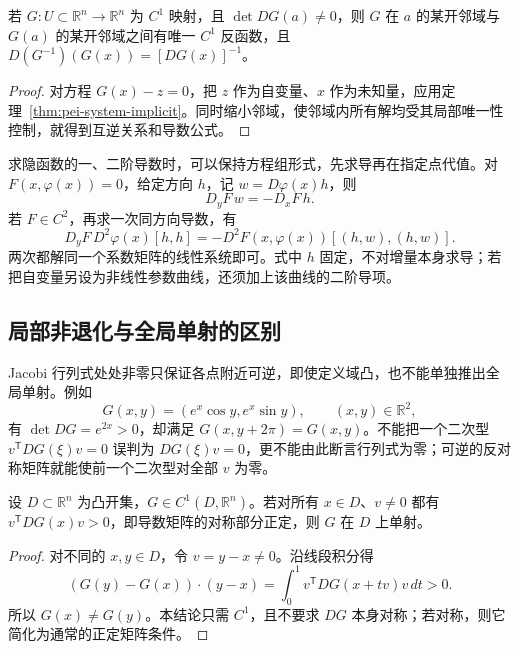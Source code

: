 \begin{corollary}
\label{cor:pei-inverse-function}
若 $G:U\subset\mathbb R^n\to\mathbb R^n$ 为 $C^1$ 映射，且 $\det DG(a)\ne0$，则 $G$ 在 $a$ 的某开邻域与 $G(a)$ 的某开邻域之间有唯一 $C^1$ 反函数，且 $D(G^{-1})(G(x))=[DG(x)]^{-1}$。
\end{corollary}
\begin{proof}
对方程 $G(x)-z=0$，把 $z$ 作为自变量、$x$ 作为未知量，应用定理~\ref{thm:pei-system-implicit}。同时缩小邻域，使邻域内所有解均受其局部唯一性控制，就得到互逆关系和导数公式。
\end{proof}

求隐函数的一、二阶导数时，可以保持方程组形式，先求导再在指定点代值。对 $F(x,\varphi(x))=0$，给定方向 $h$，记 $w=D\varphi(x)h$，则
\[
D_yF\,w=-D_xF\,h.
\]
若 $F\in C^2$，再求一次同方向导数，有
\begin{equation}
\label{eq:pei-implicit-second-differential}
D_yF\,D^2\varphi(x)[h,h]=-D^2F(x,\varphi(x))[(h,w),(h,w)].
\end{equation}
两次都解同一个系数矩阵的线性系统即可。式中 $h$ 固定，不对增量本身求导；若把自变量另设为非线性参数曲线，还须加上该曲线的二阶导项。

\subsection{局部非退化与全局单射的区别}

Jacobi 行列式处处非零只保证各点附近可逆，即使定义域凸，也不能单独推出全局单射。例如
\begin{equation}
\label{eq:pei-local-not-global-inverse}
G(x,y)=(e^x\cos y,e^x\sin y),\qquad(x,y)\in\mathbb R^2,
\end{equation}
有 $\det DG=e^{2x}>0$，却满足 $G(x,y+2\pi)=G(x,y)$。不能把一个二次型 $v^{\mathsf T}DG(\xi)v=0$ 误判为 $DG(\xi)v=0$，更不能由此断言行列式为零；可逆的反对称矩阵就能使前一个二次型对全部 $v$ 为零。

\begin{proposition}
\label{prop:pei-monotone-injectivity}
设 $D\subset\mathbb R^n$ 为凸开集，$G\in C^1(D,\mathbb R^n)$。若对所有 $x\in D$、$v\ne0$ 都有 $v^{\mathsf T}DG(x)v>0$，即导数矩阵的对称部分正定，则 $G$ 在 $D$ 上单射。
\end{proposition}
\begin{proof}
对不同的 $x,y\in D$，令 $v=y-x\ne0$。沿线段积分得
\[
(G(y)-G(x))\cdot(y-x)=\int_0^1v^{\mathsf T}DG(x+tv)v\,dt>0.
\]
所以 $G(x)\ne G(y)$。本结论只需 $C^1$，且不要求 $DG$ 本身对称；若对称，则它简化为通常的正定矩阵条件。
\end{proof}

